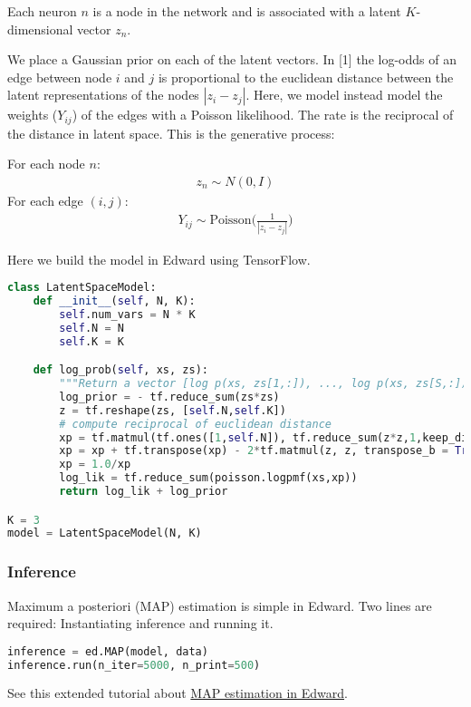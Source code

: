 Each neuron $n$ is a node in the network and is associated with a latent $K$-dimensional vector $z_n$.

We place a Gaussian prior on each of the latent vectors.
In [1] the log-odds of an edge between node $i$ and $j$ is proportional to the euclidean distance between the latent representations of the nodes $|z_i- z_j|$. Here, we model instead model the weights ($Y_{ij}$) of the edges with a Poisson likelihood. The rate is the reciprocal of the distance in latent space. This is the generative process:

For each node $n$:
\begin{align}
z_n \sim N(0,I)
\end{align}
For each edge $(i,j)$:
\begin{align}
Y_{ij} \sim \text{Poisson}\Bigg(\frac{1}{|z_i - z_j|}\Bigg)
\end{align}

Here we build the model in Edward using TensorFlow.
\begin{lstlisting}[language=Python]
class LatentSpaceModel:
    def __init__(self, N, K):
        self.num_vars = N * K
        self.N = N
        self.K = K

    def log_prob(self, xs, zs):
        """Return a vector [log p(xs, zs[1,:]), ..., log p(xs, zs[S,:])]."""
        log_prior = - tf.reduce_sum(zs*zs)
        z = tf.reshape(zs, [self.N,self.K])
        # compute reciprocal of euclidean distance
        xp = tf.matmul(tf.ones([1,self.N]), tf.reduce_sum(z*z,1,keep_dims=True))
        xp = xp + tf.transpose(xp) - 2*tf.matmul(z, z, transpose_b = True)
        xp = 1.0/xp
        log_lik = tf.reduce_sum(poisson.logpmf(xs,xp))
        return log_lik + log_prior

K = 3
model = LatentSpaceModel(N, K)
\end{lstlisting}

\subsubsection{Inference}

Maximum a posteriori (MAP) estimation is simple in Edward. Two lines are
required: Instantiating inference and running it.
\begin{lstlisting}[language=Python]
inference = ed.MAP(model, data)
inference.run(n_iter=5000, n_print=500)
\end{lstlisting}

See this extended tutorial about
\href{tut_MAP.html}{MAP estimation in Edward}.

